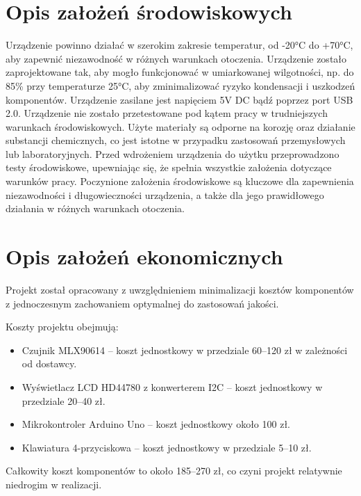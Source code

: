     \section{Opis założeń środowiskowych}
    
Urządzenie powinno działać w szerokim zakresie temperatur, od -20°C do +70°C, aby zapewnić niezawodność w różnych warunkach otoczenia. Urządzenie zostało zaprojektowane tak, aby mogło funkcjonować w umiarkowanej wilgotności, np. do 85\% przy temperaturze 25°C, aby zminimalizować ryzyko kondensacji i uszkodzeń komponentów. Urządzenie zasilane jest napięciem 5V DC bądź poprzez port USB 2.0. Urządzenie nie zostało przetestowane pod kątem pracy w trudniejszych warunkach środowiskowych. Użyte materiały są odporne na korozję oraz działanie substancji chemicznych, co jest istotne w przypadku zastosowań przemysłowych lub laboratoryjnych. Przed wdrożeniem urządzenia do użytku przeprowadzono testy środowiskowe, upewniając się, że spełnia wszystkie założenia dotyczące warunków pracy.
Poczynione założenia środowiskowe są kluczowe dla zapewnienia niezawodności i długowieczności urządzenia, a także dla jego prawidłowego działania w różnych warunkach otoczenia.

\section{Opis założeń ekonomicznych}
Projekt został opracowany z uwzględnieniem minimalizacji kosztów komponentów z jednoczesnym zachowaniem optymalnej do zastosowań jakości.

Koszty projektu obejmują: 

\begin{itemize}
    \item Czujnik MLX90614 – koszt jednostkowy w przedziale 60–120 zł w zależności od dostawcy.
    \item Wyświetlacz LCD HD44780 z konwerterem I2C – koszt jednostkowy w przedziale 20–40 zł.
    \item Mikrokontroler Arduino Uno – koszt jednostkowy około 100 zł.
    \item Klawiatura 4-przyciskowa – koszt jednostkowy w przedziale 5–10 zł. 
\end{itemize}

Całkowity koszt komponentów to około 185–270 zł, co czyni projekt relatywnie niedrogim w realizacji.